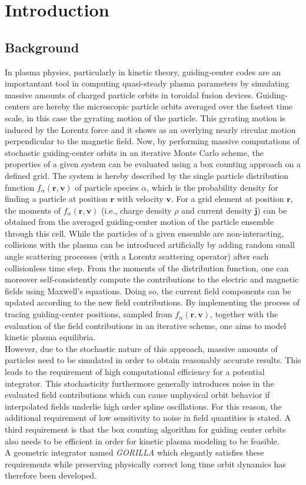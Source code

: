 \documentclass[main.tex]{subfiles}
\begin{document}
\chapter{Introduction}
\label{chp:introduction}
\section{Background}
In plasma physics, particularly in kinetic theory, guiding-center codes are an importantant tool in computing quasi-steady plasma parameters by simulating massive amounts of charged particle orbits in toroidal fusion devices. Guiding-centers are hereby the microscopic particle orbits averaged over the fastest time scale, in this case the gyrating motion of the particle. This gyrating motion is induced by the Lorentz force and it shows as an overlying nearly circular motion perpendicular to the magnetic field. Now, by performing massive computations of stochastic guiding-center orbits in an iterative Monte Carlo scheme, the properties of a given system can be evaluated using a box counting approach on a defined grid. The system is hereby described by the single particle distribution function $f_\alpha(\textbf{r},\textbf{v})$ of particle species $\alpha$, which is the probability density for finding a particle at position $\textbf{r}$ with velocity $\textbf{v}$. For a grid element at position $\textbf{r}$, the moments of $f_\alpha(\textbf{r},\textbf{v})$ (i.e., charge density $\rho$ and current density $\textbf{j}$) can be obtained from the averaged guiding-center motion of the particle ensemble through this cell. While the particles of a given ensemble are non-interacting, collisions with the plasma can be introduced artificially by adding random small angle scattering processes (with a Lorentz scattering operator) after each collisionless time step. From the moments of the distribution function, one can moreover self-consistently compute the contributions to the electric and magnetic fields using Maxwell's equations. Doing so, the current field components can be updated according to the new field contributions. By implementing the process of tracing guiding-center positions, sampled from $f_\alpha(\textbf{r},\textbf{v})$, together with the evaluation of the field contributions in an iterative scheme, one aims to model kinetic plasma equilibria. \\
However, due to the stochastic nature of this approach, massive amounts of particles need to be simulated in order to obtain reasonably accurate results. This leads to the requirement of high computational efficiency for a potential integrator.
This stochasticity furthermore generally introduces noise in the evaluated field contributions which can cause unphysical orbit behavior if interpolated fields underlie high order spline oscillations. For this reason, the additional requirement of low sensitivity to noise in field quantities is stated. A third requirement is that the box counting algorithm for guiding center orbits also needs to be efficient in order for kinetic plasma modeling to be feasible.\\
A geometric integrator named \textit{GORILLA} which elegantly satisfies these requirements while preserving physically correct long time orbit dynamics has therefore been developed. 
\end{document}
